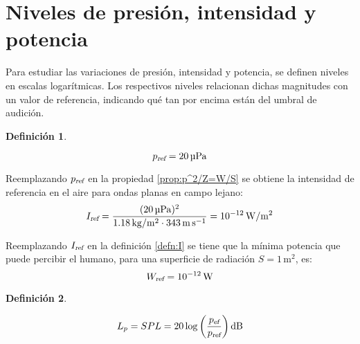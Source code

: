 \documentclass[a5paper,12pt,twoside]{book}
\newtheorem{defn}{{Definición}}[chapter]
\begin{document}




\section{Niveles de presión, intensidad y potencia}

Para estudiar las variaciones de presión, intensidad y potencia, se definen niveles en escalas logarítmicas.
Los respectivos niveles relacionan dichas magnitudes con un valor de referencia, indicando qué tan por encima están del umbral de audición.

\begin{mdframed}[style=DefinitionFrame]
    \begin{defn}
    \end{defn}
    \begin{equation*}
        {{p}_\textsl{{ref}}} = 20\,\si{\micro\pascal}
    \end{equation*}
\end{mdframed}

Reemplazando ${{p}_\textsl{{ref}}}$ en la propiedad \ref{prop:p^2/Z=W/S} se obtiene la intensidad de referencia en el aire para ondas planas en campo lejano:
\begin{equation*}
    {{I}_\textsl{{ref}}}=\frac{(20\,\si{\micro\pascal})^2}{1.18\,\si{\kilo\gram\per\metre^2} \cdot 343\,\si{\metre\per\second}} = 10^{-12}\,\si{\watt\per\metre^2}
\end{equation*}

Reemplazando ${{I}_\textsl{{ref}}}$ en la definición \ref{defn:I} se tiene que la mínima potencia que puede percibir el humano, para una superficie de radiación $S=1\,\si{\metre^2}$, es:
\begin{equation*}
    {{W}_\textsl{{ref}}} = 10^{-12}\,\si{\watt}
\end{equation*}

\begin{mdframed}[style=DefinitionFrame]
    \begin{defn}
        \label{defn:SPL}
    \end{defn}
    \begin{equation*}
        L_p = SPL = 20 \log \left( \frac{\rms{p}}{\sub{p}{ref}} \right) \si{\deci\bel}
    \end{equation*}
\end{mdframed}
\end{document}
